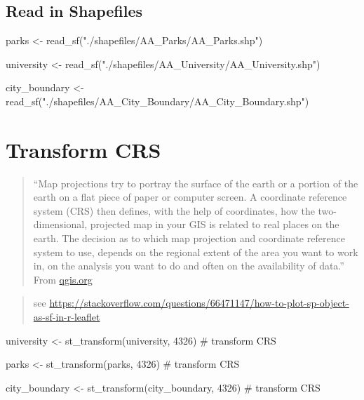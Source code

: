 \documentclass[
  letterpaper,
  DIV=11,
  numbers=noendperiod,
  oneside]{scrreprt}
\newenvironment{Shaded}{\begin{snugshade}}{\end{snugshade}}
\newcommand{\CommentTok}[1]{\textcolor[rgb]{0.37,0.37,0.37}{#1}}
\newcommand{\DecValTok}[1]{\textcolor[rgb]{0.68,0.00,0.00}{#1}}
\newcommand{\FunctionTok}[1]{\textcolor[rgb]{0.28,0.35,0.67}{#1}}
\newcommand{\NormalTok}[1]{\textcolor[rgb]{0.00,0.23,0.31}{#1}}
\newcommand{\OtherTok}[1]{\textcolor[rgb]{0.00,0.23,0.31}{#1}}
\newcommand{\StringTok}[1]{\textcolor[rgb]{0.13,0.47,0.30}{#1}}
\begin{document}
\section{Read in Shapefiles}\label{read-in-shapefiles-1}

\begin{Shaded}
\begin{Highlighting}[]
\NormalTok{parks }\OtherTok{\textless{}{-}} \FunctionTok{read\_sf}\NormalTok{(}\StringTok{"./shapefiles/AA\_Parks/AA\_Parks.shp"}\NormalTok{)}

\NormalTok{university }\OtherTok{\textless{}{-}} \FunctionTok{read\_sf}\NormalTok{(}\StringTok{"./shapefiles/AA\_University/AA\_University.shp"}\NormalTok{)}

\NormalTok{city\_boundary }\OtherTok{\textless{}{-}} \FunctionTok{read\_sf}\NormalTok{(}\StringTok{"./shapefiles/AA\_City\_Boundary/AA\_City\_Boundary.shp"}\NormalTok{)}
\end{Highlighting}
\end{Shaded}

\chapter{Transform CRS}\label{transform-crs}

\begin{quote}
``Map projections try to portray the surface of the earth or a portion
of the earth on a flat piece of paper or computer screen. A coordinate
reference system (CRS) then defines, with the help of coordinates, how
the two-dimensional, projected map in your GIS is related to real places
on the earth. The decision as to which map projection and coordinate
reference system to use, depends on the regional extent of the area you
want to work in, on the analysis you want to do and often on the
availability of data.'' From
\href{https://docs.qgis.org/2.8/en/docs/gentle_gis_introduction/coordinate_reference_systems.html}{qgis.org}
\end{quote}

\begin{quote}
see
\url{https://stackoverflow.com/questions/66471147/how-to-plot-sp-object-as-sf-in-r-leaflet}
\end{quote}

\begin{Shaded}
\begin{Highlighting}[]
\NormalTok{university }\OtherTok{\textless{}{-}} \FunctionTok{st\_transform}\NormalTok{(university, }\DecValTok{4326}\NormalTok{) }\CommentTok{\# transform CRS}

\NormalTok{parks }\OtherTok{\textless{}{-}} \FunctionTok{st\_transform}\NormalTok{(parks, }\DecValTok{4326}\NormalTok{) }\CommentTok{\# transform CRS}

\NormalTok{city\_boundary }\OtherTok{\textless{}{-}} \FunctionTok{st\_transform}\NormalTok{(city\_boundary, }\DecValTok{4326}\NormalTok{) }\CommentTok{\# transform CRS}
\end{Highlighting}
\end{Shaded}
\end{document}
